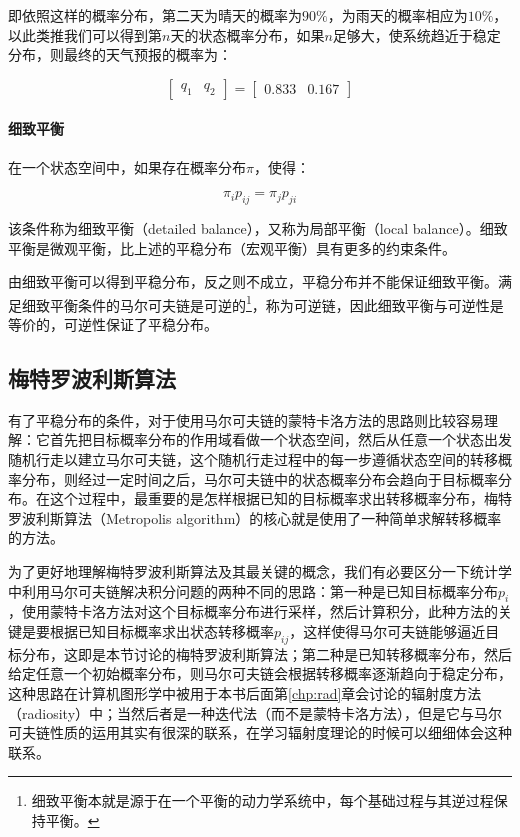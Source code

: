 \noindent 即依照这样的概率分布，第二天为晴天的概率为$90\%$，为雨天的概率相应为$10\%$，以此类推我们可以得到第$n$天的状态概率分布，如果$n$足够大，使系统趋近于稳定分布，则最终的天气预报的概率为：

\begin{equation}
	\begin{bmatrix}
		q_1&q_2
	\end{bmatrix}=\begin{bmatrix}
		0.833&0.167
	\end{bmatrix}
\end{equation}





\paragraph{细致平衡}
在一个状态空间中，如果存在概率分布$\pi$，使得：

\begin{equation}
	\pi_i p_{ij}=\pi_j p_{ji}
\end{equation}

\noindent 该条件称为细致平衡（detailed balance），又称为局部平衡（local balance）。细致平衡是微观平衡，比上述的平稳分布（宏观平衡）具有更多的约束条件。

由细致平衡可以得到平稳分布，反之则不成立，平稳分布并不能保证细致平衡。满足细致平衡条件的马尔可夫链是可逆的\footnote{细致平衡本就是源于在一个平衡的动力学系统中，每个基础过程与其逆过程保持平衡。}，称为可逆链，因此细致平衡与可逆性是等价的，可逆性保证了平稳分布。






\subsection{梅特罗波利斯算法}
有了平稳分布的条件，对于使用马尔可夫链的蒙特卡洛方法的思路则比较容易理解：它首先把目标概率分布的作用域看做一个状态空间，然后从任意一个状态出发随机行走以建立马尔可夫链，这个随机行走过程中的每一步遵循状态空间的转移概率分布，则经过一定时间之后，马尔可夫链中的状态概率分布会趋向于目标概率分布。在这个过程中，最重要的是怎样根据已知的目标概率求出转移概率分布，梅特罗波利斯算法（Metropolis algorithm）的核心就是使用了一种简单求解转移概率的方法。

为了更好地理解梅特罗波利斯算法及其最关键的概念，我们有必要区分一下统计学中利用马尔可夫链解决积分问题的两种不同的思路：第一种是已知目标概率分布$p_i$，使用蒙特卡洛方法对这个目标概率分布进行采样，然后计算积分，此种方法的关键是要根据已知目标概率求出状态转移概率$p_{ij}$，这样使得马尔可夫链能够逼近目标分布，这即是本节讨论的梅特罗波利斯算法；第二种是已知转移概率分布，然后给定任意一个初始概率分布，则马尔可夫链会根据转移概率逐渐趋向于稳定分布，这种思路在计算机图形学中被用于本书后面第\ref{chp:rad}章会讨论的辐射度方法（radiosity）中；当然后者是一种迭代法（而不是蒙特卡洛方法），但是它与马尔可夫链性质的运用其实有很深的联系，在学习辐射度理论的时候可以细细体会这种联系。

